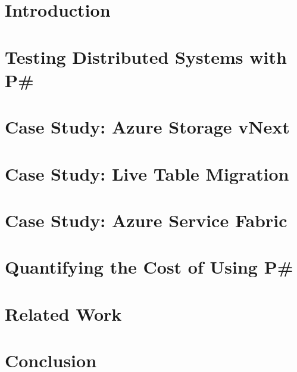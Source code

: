 \documentclass[letterpaper,twocolumn,10pt]{article}
\newcommand{\psharp}{P\#\xspace}
\begin{document}
\vspace{-1mm}
\section{Introduction}
\label{sec:intro}
\vspace{-1mm}



%
%

\section{Testing Distributed Systems with \psharp}
\label{sec:overview}



\section{Case Study: Azure Storage vNext}
\label{sec:vnext}



\section{Case Study: Live Table Migration}
\label{sec:migrating}



\section{Case Study: Azure Service Fabric}
\label{sec:fabric}



\section{Quantifying the Cost of Using \psharp}
\label{sec:eval}



\section{Related Work}
\label{sec:rw}



\section{Conclusion}
\label{sec:conclusion}
\end{document}

